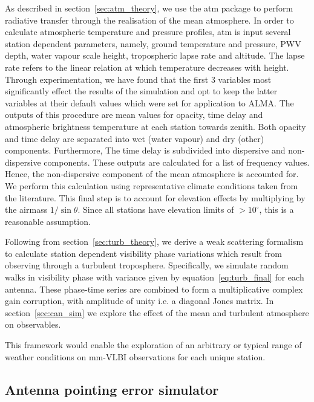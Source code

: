 As described in section~\ref{sec:atm_theory}, we use the {\sc atm} package to perform radiative transfer through the realisation of the mean atmosphere. 
In order to calculate atmospheric temperature and pressure profiles, {\sc atm} is input several station dependent parameters, namely, ground temperature and pressure, PWV depth, water vapour scale height, tropospheric lapse rate  and altitude. The lapse rate refers to the linear relation at which temperature decreases with height. Through experimentation, we have found that the first 3 variables most significantly effect the results of the simulation and opt to keep the latter variables at their default values which were set for application to ALMA. 
The outputs of this procedure are mean values for opacity, time delay and atmospheric brightness temperature at each station towards zenith. Both opacity and time delay are separated into wet (water vapour) and dry (other) components. Furthermore, The time delay is subdivided into dispersive and non-dispersive  components. These outputs are calculated for a list of frequency values. Hence, the non-dispersive component of the mean atmosphere is accounted for.
We perform this calculation using representative climate conditions taken from the literature. This final step is to account for elevation effects by multiplying by the airmass $1/\sin\theta$. Since all stations have elevation limits of $>10^\circ$, this is a reasonable assumption.

Following from section~\ref{sec:turb_theory}, we derive a weak scattering formalism to calculate station dependent visibility phase variations which result from observing through a turbulent troposphere. Specifically, we simulate random walks in visibility phase with variance given by equation~\ref{eq:turb_final} for each antenna. These phase-time series are combined to form a multiplicative complex gain corruption, with amplitude of unity i.e. a diagonal Jones matrix. In section~\ref{sec:can_sim} we explore the effect of the mean and turbulent atmosphere on observables.


This framework would enable the exploration of an arbitrary or typical range of weather conditions on mm-VLBI observations for each unique station.

\subsection{Antenna pointing error simulator}\label{sec:point_imp}

